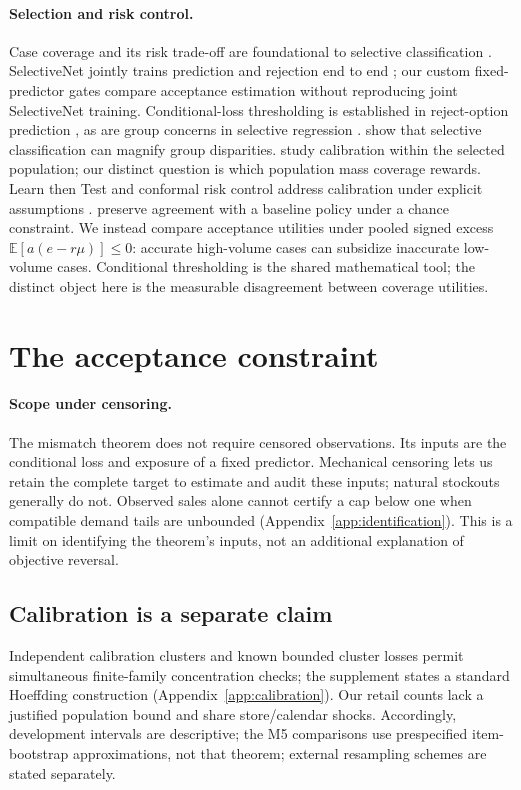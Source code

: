 \documentclass{article}
\newcommand{\E}{\mathbb{E}}
\begin{document}
\paragraph{Selection and risk control.}
Case coverage and its risk trade-off are foundational to selective classification \citep{elyaniv2010foundations,geifman2017selective}. SelectiveNet jointly trains prediction and rejection end to end \citep{geifman2019selectivenet}; our custom fixed-predictor gates compare acceptance estimation without reproducing joint SelectiveNet training. Conditional-loss thresholding is established in reject-option prediction \citep{franc2023reject}, as are group concerns in selective regression \citep{shah2022selective}. \citet{jones2021} show that selective classification can magnify group disparities. \citet{fisch2022} study calibration within the selected population; our distinct question is which population mass coverage rewards. Learn then Test and conformal risk control address calibration under explicit assumptions \citep{angelopoulos2021ltt,angelopoulos2024crc}. \citet{joshi2026postprocess} preserve agreement with a baseline policy under a chance constraint. We instead compare acceptance utilities under pooled signed excess $\E[a(e-r\mu)]\leq0$: accurate high-volume cases can subsidize inaccurate low-volume cases. Conditional thresholding is the shared mathematical tool; the distinct object here is the measurable disagreement between coverage utilities.


\section{The acceptance constraint}


\paragraph{Scope under censoring.}
The mismatch theorem does not require censored observations. Its inputs are the conditional loss and exposure of a fixed predictor. Mechanical censoring lets us retain the complete target to estimate and audit these inputs; natural stockouts generally do not. Observed sales alone cannot certify a cap below one when compatible demand tails are unbounded (Appendix~\ref{app:identification}). This is a limit on identifying the theorem's inputs, not an additional explanation of objective reversal.

\subsection{Calibration is a separate claim}
\label{sec:calibration}
Independent calibration clusters and known bounded cluster losses permit simultaneous finite-family concentration checks; the supplement states a standard Hoeffding construction (Appendix~\ref{app:calibration}). Our retail counts lack a justified population bound and share store/calendar shocks. Accordingly, development intervals are descriptive; the M5 comparisons use prespecified item-bootstrap approximations, not that theorem; external resampling schemes are stated separately.
\end{document}
